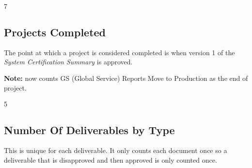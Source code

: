 \documentclass{article}
\begin{document}
\begin{Schunk}
\begin{Soutput}
[1] 7
\end{Soutput}
\end{Schunk}

\subsection{Projects Completed}

The point at which a project is considered completed is when version 1 of the
\textit{System Certification Summary} is approved.

\textbf{Note:} now counts GS (Global Service) Reports Move to Production as the end
of project.

\begin{Schunk}
\begin{Soutput}
[1] 5
\end{Soutput}
\end{Schunk}


\subsection{Number Of Deliverables by Type}
This is unique for each deliverable. It only counts each document once so a deliverable
that is disapproved and then approved is only counted once.
\end{document}
